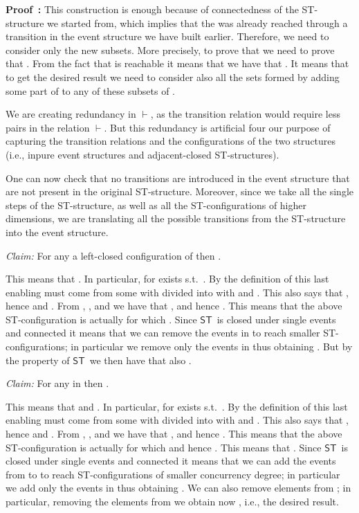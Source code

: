 \documentclass[submission,copyright,creativecommons]{eptcs}
\newenvironment{proof}[1][\!\!\,]{\vspace{1ex}\noindent\textbf{Proof #1: }}{\hfill\vspace{2ex}}
\newcommand\ST{\ensuremath{\mathsf{ST}}}
\newcommand\enableRelEv{\ensuremath{\vdash}}
\begin{document}
\begin{proof}
This construction is enough because of connectedness of the ST-structure we started from, which implies that the  was already reached through a transition in the event structure we have built earlier. Therefore, we need to consider only the new subsets. More precisely, to prove that  we need to prove that . From the fact that  is reachable it means that we have that . It means that to get the desired result we need to consider also all the sets formed by adding some part of  to any of these subsets  of .

We are creating redundancy in \enableRelEv, as the transition relation would require less pairs in the relation \enableRelEv. But this redundancy is artificial four our purpose of capturing the transition relations and the configurations of the two structures (i.e., inpure event structures and adjacent-closed ST-structures).



One can now check that no transitions are introduced in the event structure that are not present in the original ST-structure. Moreover, since we take all the single steps of the ST-structure, as well as all the ST-configurations of higher dimensions, we are translating all the possible transitions from the ST-structure into the event structure.

\vspace{1ex}
\noindent\textit{Claim:}\hspace{1ex} For any  a left-closed configuration of  then .
\vspace{0.5ex}

This means that . In particular, for  exists  s.t.\ . 
By the definition of  this last enabling must come from some  with  divided into  with  and . This also says that , hence  and . From , , and  we have that , and hence . This means that the above ST-configuration is actually  for which . Since \ST\ is closed under single events and connected it means that we can remove the events in  to reach smaller ST-configurations; in particular we remove only the events in  thus obtaining . But by the property of \ST\ we then have that also .

\vspace{1ex}
\noindent\textit{Claim:}\hspace{1ex} For any  in  then .
\vspace{0.5ex}

This means that  and . In particular, for  exists  s.t.\ . 
By the definition of  this last enabling must come from some  with  divided into  with  and . This also says that , hence  and . From , , and  we have that , and hence . This means that the above ST-configuration is actually  for which  and hence . This means that . Since \ST\ is closed under single events and connected it means that we can add the events from  to  to reach ST-configurations of smaller concurrency degree; in particular we add only the events in  thus obtaining . We can also remove elements from ; in particular, removing the elements from  we obtain now , i.e., the desired result.
\end{proof}
\end{document}
